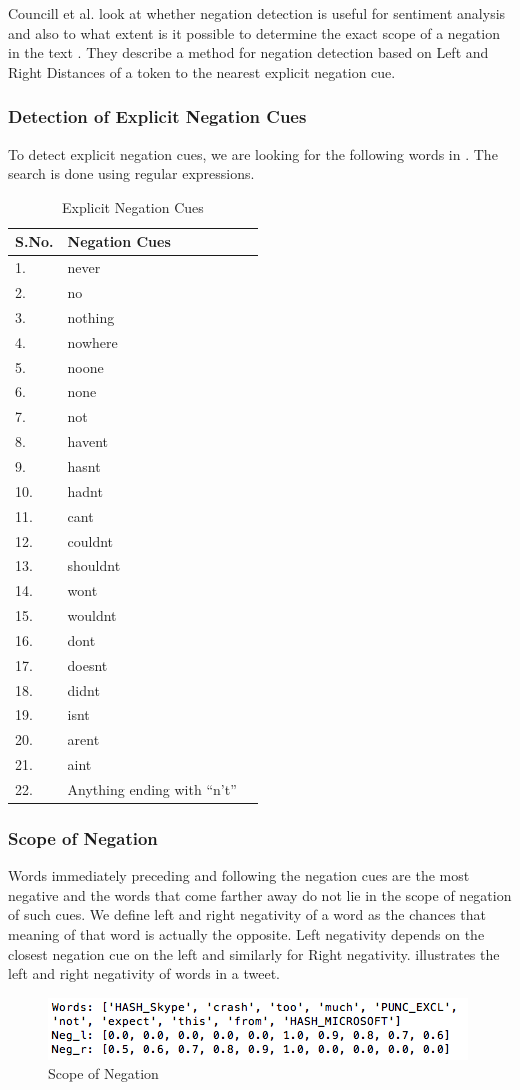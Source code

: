 Councill et al. look at whether negation detection is useful for sentiment
analysis and also to what extent is it possible to determine the exact scope of
a negation in the text \cite{CMV}. They describe a method for negation detection
based on Left and Right Distances of a token to the nearest explicit negation
cue.

\subsubsection*{Detection of Explicit Negation Cues} To detect explicit negation
cues, we are looking for the following words in . The
search is done using regular expressions.

\begin{table}[h!]
\centering
\begin{tabular}{|l|l|l|}
\hline
S.No. & Negation Cues \\\hline
1.  & never \\
2.  & no \\
3.  & nothing \\
4.  & nowhere \\
5.  & noone \\
6.  & none \\
7.  & not \\
8.  & havent \\
9.  & hasnt \\
10.  & hadnt \\
11.  & cant \\
12.  & couldnt \\
13.  & shouldnt \\
14.  & wont \\
15.  & wouldnt \\
16.  & dont \\
17.  & doesnt \\
18.  & didnt \\
19.  & isnt \\
20.  & arent \\
21.  & aint \\
22.  & Anything ending with ``n't'' \\\hline
\end{tabular}
\caption{Explicit Negation Cues}
\label{tab:negation}
\end{table}

\subsubsection*{Scope of Negation} Words immediately preceding and following the
negation cues are the most negative and the words that come farther away do not
lie in the scope of negation of such cues. We define left and right negativity
of a word as the chances that meaning of that word is actually the opposite.
Left negativity depends on the closest negation cue on the left and similarly
for Right negativity.  illustrates the left and right
negativity of words in a tweet.

\begin{figure}[h!]
\centering
\includegraphics[width=\textwidth]{img/negation.png}
\caption{Scope of Negation}
\label{fig:negation}
\end{figure}
